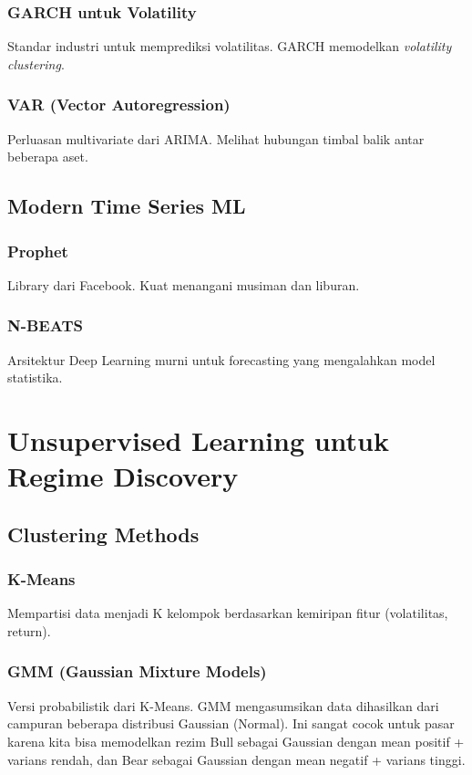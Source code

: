 \documentclass[12pt,a4paper]{book}
\begin{document}
\subsection{GARCH untuk Volatility}
Standar industri untuk memprediksi volatilitas. GARCH memodelkan \textit{volatility clustering}.

\subsection{VAR (Vector Autoregression)}
Perluasan multivariate dari ARIMA. Melihat hubungan timbal balik antar beberapa aset.

\section{Modern Time Series ML}
\subsection{Prophet}
Library dari Facebook. Kuat menangani musiman dan liburan.
\subsection{N-BEATS}
Arsitektur Deep Learning murni untuk forecasting yang mengalahkan model statistika.

\chapter{Unsupervised Learning untuk Regime Discovery}
\section{Clustering Methods}
\subsection{K-Means}
Mempartisi data menjadi K kelompok berdasarkan kemiripan fitur (volatilitas, return).
\subsection{GMM (Gaussian Mixture Models)}
Versi probabilistik dari K-Means. GMM mengasumsikan data dihasilkan dari campuran beberapa distribusi Gaussian (Normal). Ini sangat cocok untuk pasar karena kita bisa memodelkan rezim Bull sebagai Gaussian dengan mean positif + varians rendah, dan Bear sebagai Gaussian dengan mean negatif + varians tinggi.
\end{document}
